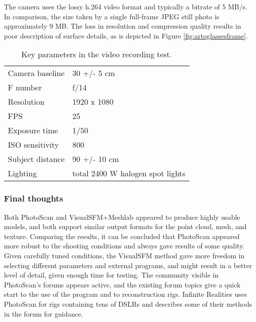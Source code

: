 The camera uses the lossy h.264 video format and typically a bitrate of 5 MB/s.
In comparison, the size taken by a single full-frame JPEG still photo is approximately 9 MB.
The loss in resolution and compression quality results in poor description of surface details, as is depicted in Figure \ref{fig:artoglassesframe}.

\begin{table}[t]
	\centering
	\begin{tabular}{l l}
		Camera baseline & 30 +/- 5 cm\\
		F number & f/14\\
		Resolution & 1920 x 1080\\
		FPS & 25\\
		Exposure time & 1/50\\
		ISO sensitivity & 800\\
		Subject distance & 90 +/- 10 cm\\
		Lighting & total 2400 W halogen spot lights\\
	\end{tabular}
	\caption{
		Key parameters in the video recording test.
	}
	\label{tab:samplevideoparams}
\end{table}




\subsubsection{Final thoughts}

Both PhotoScan and VisualSFM+Meshlab appeared to produce highly usable models, and both support similar output formats for the point cloud, mesh, and texture.
Comparing the results, it can be concluded that PhotoScan appeared more robust to the shooting conditions and always gave results of some quality.
Given carefully tuned conditions, the VisualSFM method gave more freedom in selecting different parameters and external programs, and might result in a better level of detail, given enough time for testing.
The community visible in PhotoScan's forums \cite{agisoftforum} appears active, and the existing forum topics give a quick start to the use of the program and to reconstruction rigs.
Infinite Realities uses PhotoScan for rigs containing tens of DSLRs \cite{ir-ltd} and describes some of their methods in the forum for guidance.

